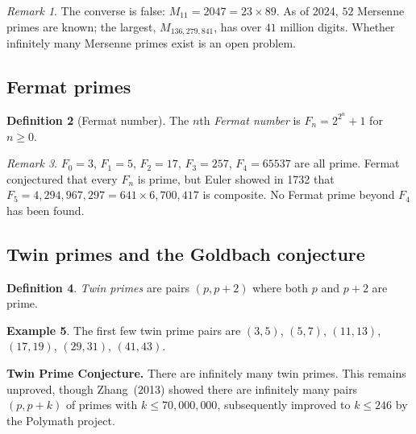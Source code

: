 \documentclass[12pt,a4paper,openany]{book}
\theoremstyle{definition}
\newtheorem{definition}{Definition}[chapter]
\newtheorem{example}[definition]{Example}
\theoremstyle{plain}
\theoremstyle{remark}
\newtheorem{remark}[definition]{Remark}
\begin{document}
\begin{remark}
\label{rem:mersenne-examples}
The converse is false: $M_{11} = 2047 = 23 \times 89$. As of 2024, $52$
Mersenne primes are known; the largest, $M_{136{,}279{,}841}$, has over $41$ million digits.
Whether infinitely many Mersenne primes exist is an open problem.
\end{remark}

\subsection{Fermat primes}
\label{subsec:fermat-primes}

\begin{definition}[Fermat number]
\label{def:fermat-number}
The $n$th \emph{Fermat number} is $F_n = 2^{2^n} + 1$ for $n \ge 0$.
\end{definition}

\begin{remark}
\label{rem:fermat-primes}
$F_0 = 3$, $F_1 = 5$, $F_2 = 17$, $F_3 = 257$, $F_4 = 65537$ are all prime.
Fermat conjectured that every $F_n$ is prime, but Euler showed in 1732 that
$F_5 = 4{,}294{,}967{,}297 = 641 \times 6{,}700{,}417$ is composite.
No Fermat prime beyond $F_4$ has been found.
\end{remark}

\subsection{Twin primes and the Goldbach conjecture}
\label{subsec:twin-goldbach}

\begin{definition}
\label{def:twin-primes}
\emph{Twin primes} are pairs $(p, p+2)$ where both $p$ and $p+2$ are prime.
\end{definition}

\begin{example}
\label{ex:twin-primes}
The first few twin prime pairs are $(3,5)$, $(5,7)$, $(11,13)$, $(17,19)$,
$(29,31)$, $(41,43)$.
\end{example}

\noindent\textbf{Twin Prime Conjecture.}
There are infinitely many twin primes. This remains unproved, though
Zhang~(2013) showed there are infinitely many pairs
$(p, p+k)$ of primes with $k \le 70{,}000{,}000$, subsequently improved to
$k \le 246$ by the Polymath project.
\end{document}

